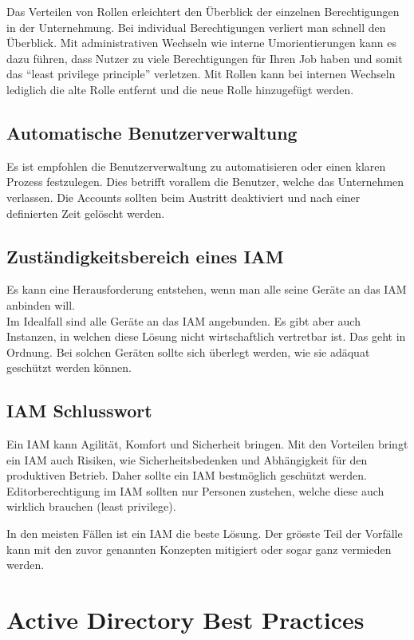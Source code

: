 Das Verteilen von Rollen erleichtert den Überblick der einzelnen Berechtigungen in der Unternehmung.
Bei individual Berechtigungen verliert man schnell den Überblick.
Mit administrativen Wechseln wie interne Umorientierungen kann es dazu führen, dass Nutzer zu viele Berechtigungen für Ihren Job haben und somit das ``least privilege principle'' verletzen.
Mit Rollen kann bei internen Wechseln lediglich die alte Rolle entfernt und die neue Rolle hinzugefügt werden.


\subsection{Automatische Benutzerverwaltung}
Es ist empfohlen die Benutzerverwaltung zu automatisieren oder einen klaren Prozess festzulegen.
Dies betrifft vorallem die Benutzer, welche das Unternehmen verlassen.
Die Accounts sollten beim Austritt deaktiviert und nach einer definierten Zeit gelöscht werden.


\subsection{Zuständigkeitsbereich eines IAM}
Es kann eine Herausforderung entstehen, wenn man alle seine Geräte an das IAM anbinden will.\\

Im Idealfall sind alle Geräte an das IAM angebunden.
Es gibt aber auch Instanzen, in welchen diese Lösung nicht wirtschaftlich vertretbar ist.
Das geht in Ordnung.
Bei solchen Geräten sollte sich überlegt werden, wie sie adäquat geschützt werden können.

\subsection{IAM Schlusswort}
Ein IAM kann Agilität, Komfort und Sicherheit bringen.
Mit den Vorteilen bringt ein IAM auch Risiken, wie Sicherheitsbedenken und Abhängigkeit für den produktiven Betrieb.
Daher sollte ein IAM bestmöglich geschützt werden.
Editorberechtigung im IAM sollten nur Personen zustehen, welche diese auch wirklich brauchen (least privilege).

In den meisten Fällen ist ein IAM die beste Lösung.
Der grösste Teil der Vorfälle kann mit den zuvor genannten Konzepten mitigiert oder sogar ganz vermieden werden.

\newpage
\section{Active Directory Best Practices}

